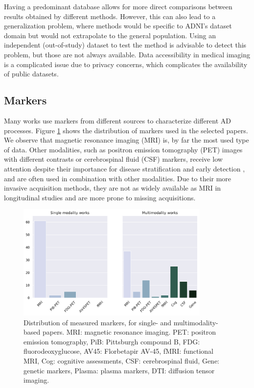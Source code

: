 Having a predominant database allows for more direct comparisons between results obtained by different methods. However, this can also lead to a generalization problem, where methods would be specific to ADNI's dataset domain but would not extrapolate to the general population. Using an independent (out-of-study) dataset to test the method is advisable to detect this problem, but those are not always available. Data accessibility in medical imaging is a complicated issue due to privacy concerns, which complicates the availability of public datasets. \\

\subsection{Markers}

Many works use markers from different sources to characterize different AD processes. Figure \ref{fig:modalities} shows the distribution of markers used in the selected papers. We observe that magnetic resonance imaging (MRI) is, by far the most used type of data. Other modalities, such as positron emission tomography (PET) images with different contrasts or cerebrospinal fluid (CSF) markers, receive low attention despite their importance for disease stratification and early detection \cite{Andreasen1999,Clark2011,Weiner2005}, and are often used in combination with other modalities. Due to their more invasive acquisition methods, they are not as widely available as MRI in longitudinal studies and are more prone to missing acquisitions. \\

\begin{figure}[!htbp]
\centering
\includegraphics[width=0.85\textwidth]{figures/review/Fig6.pdf}
    \caption[Distribution of measured markers, for single- and multi modality-based papers.]{\small Distribution of measured markers, for single- and multimodality-based papers. MRI:  magnetic resonance imaging. PET: positron emission tomography, PiB: Pittsburgh compound B, FDG: fluorodeoxyglucose, AV45: Florbetapir AV-45, fMRI: functional MRI, Cog: cognitive assessments, CSF: cerebrospinal fluid, Gene: genetic markers, Plasma: plasma markers, DTI: diffusion tensor imaging.}\label{fig:modalities}
\end{figure}


